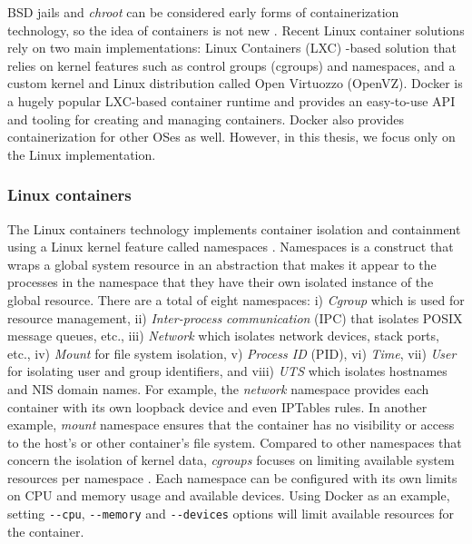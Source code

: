 \documentclass[english, 12pt, a4paper, sci, utf8, a-2b, online]{aaltothesis}
\begin{document}
BSD jails and \emph{chroot} can be considered early forms of containerization technology, so the idea of containers is not new \cite{combe2016docker}.
Recent Linux container solutions rely on two main implementations: Linux Containers (LXC) -based solution that relies on kernel features such as control groups (cgroups) and namespaces, and a custom kernel and Linux distribution called Open Virtuozzo (OpenVZ).
Docker \cite{docker} is a hugely popular LXC-based container runtime and provides an easy-to-use API and tooling for creating and managing containers.
Docker also provides containerization for other OSes as well.
However, in this thesis, we focus only on the Linux implementation.

\subsubsection{Linux containers}

The Linux containers technology implements container isolation and containment using a Linux kernel feature called namespaces \cite{lin2018measurement}.
Namespaces \cite{manpages-namespace} is a construct that wraps a global system resource in an abstraction that makes it appear to the processes in the namespace that they have their own isolated instance of the global resource.
There are a total of eight namespaces: i) \emph{Cgroup} which is used for resource management, ii) \emph{Inter-process communication} (IPC) that isolates POSIX message queues, etc., iii) \emph{Network} which isolates network devices, stack ports, etc., iv) \emph{Mount} for file system isolation, v) \emph{Process ID} (PID), vi) \emph{Time}, vii) \emph{User} for isolating user and group identifiers, and viii) \emph{UTS} which isolates hostnames and NIS domain names.
For example, the \emph{network} namespace provides each container with its own loopback device and even IPTables rules.
In another example, \emph{mount} namespace ensures that the container has no visibility or access to the host's or other container's file system.
Compared to other namespaces that concern the isolation of kernel data, \emph{cgroups} focuses on limiting available system resources per namespace \cite{lin2018measurement}.
Each namespace can be configured with its own limits on CPU and memory usage and available devices.
Using Docker as an example, setting \lstinline{--cpu}, \lstinline{--memory} and \lstinline{--devices} options will limit available resources for the container.
\end{document}
